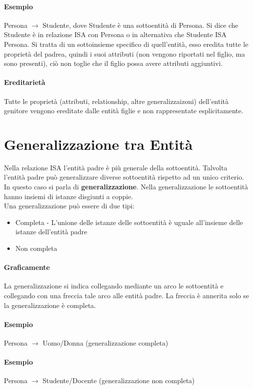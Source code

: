 \paragraph*{Esempio}Persona $\rightarrow$ Studente, dove Studente è una sottoentità
di Persona. Si dice che Studente è in relazione ISA con Persona o in alternativa
che Studente ISA Persona.
Si tratta di un sottoinsieme specifico di quell'entità, esso eredita tutte le
proprietà del padrea, quindi i suoi attributi (non vengono riportati nel figlio, ma sono
presenti), ciò non toglie che il figlio possa avere attributi aggiuntivi.
\paragraph*{Ereditarietà} Tutte le proprietà (attributi, relationship, altre generalizzaizoni)
dell'entità genitore vengono ereditate dalle entità figlie e non rappresentate
esplicitamente.
\section{Generalizzazione tra Entità}
Nella relazione ISA l'entità padre è più generale della sottoentità. Talvolta
l'entità padre può generalizzare diverse sottoentità rispetto ad un unico
criterio. In questo caso si parla di \textbf{generalizzazione}.
Nella generalizzazione le sottoentità hanno insiemi di istanze disgiunti a coppie.
\\ Una generalizzazione può essere di due tipi:
\begin{itemize}
    \item Completa - L'unione delle istanze delle sottoentità è uguale all'insieme
    delle istanze dell'entità padre
    \item Non completa
\end{itemize}
\paragraph*{Graficamente} La generalizzazione si indica collegando
mediante un arco le sottoentità e collegando con una freccia tale arco alle entità
padre. La freccia è annerita solo se la generalizzazione è completa.
\paragraph*{Esempio} Persona $\rightarrow$ Uomo/Donna (generalizzazione completa)
\paragraph*{Esempio} Persona $\rightarrow$ Studente/Docente (generalizzazione non completa)

